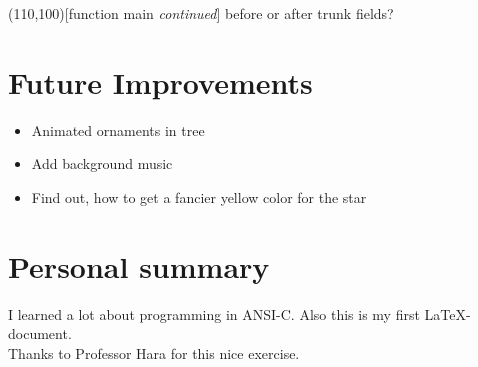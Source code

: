 \documentclass[10pt,a4paper]{article}
\begin{document}
  \begin{center}
  \begin{struktogramm}(110,100)[function main \textit{continued}] 
        {before or after trunk fields?}{\sTrue}{\sFalse}
        \change
        \ifend
      \forallinend
    \forallinend

      \forallinend
    \forallinend
  \end{struktogramm}
  \end{center}

  \section*{Future Improvements}
  \begin{itemize}
    \item Animated ornaments in tree
    \item Add background music 
    \item Find out, how to get a fancier yellow color for the star
  \end{itemize}
  \section*{Personal summary}
      \begin{flushleft}
        I learned a lot about programming in ANSI-C. Also this is my first \LaTeX-document. \\
        Thanks to Professor Hara for this nice exercise.
      \end{flushleft}
\end{document}
